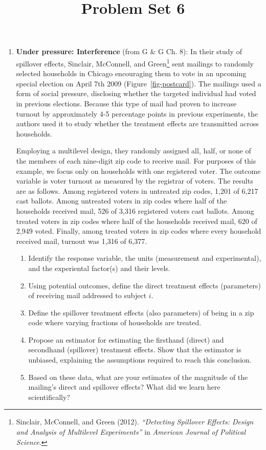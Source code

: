 \documentclass[
  letterpaper,
  DIV=11,
  numbers=noendperiod]{scrartcl}
\title{Problem Set 6}
\author{}
\date{}
\newcounter{none} %
\begin{document}
\maketitle


\begin{enumerate}
\def\labelenumi{\arabic{enumi}.}
\item
  \textbf{Under pressure: Interference} (from G \& G Ch. 8): In their
  study of spillover effects, Sinclair, McConnell, and Green\footnote{Sinclair,
    McConnell, and Green (2012). \emph{``Detecting Spillover Effects:
    Design and Analysis of Multilevel Experiments''} in \emph{American
    Journal of Political Science}.} sent mailings to randomly selected
  households in Chicago encouraging them to vote in an upcoming special
  election on April 7th 2009 (Figure~\ref{fig-postcard}). The mailings
  used a form of social pressure, disclosing whether the targeted
  individual had voted in previous elections. Because this type of mail
  had proven to increase turnout by approximately 4-5 percentage points
  in previous experiments, the authors used it to study whether the
  treatment effects are transmitted across households.

  Employing a multilevel design, they randomly assigned all, half, or
  none of the members of each nine-digit zip code to receive mail. For
  purposes of this example, we focus only on households with one
  registered voter. The outcome variable is voter turnout as measured by
  the registrar of voters. The results are as follows. Among registered
  voters in untreated zip codes, 1,201 of 6,217 cast ballots. Among
  untreated voters in zip codes where half of the households received
  mail, 526 of 3,316 registered voters cast ballots. Among treated
  voters in zip codes where half of the households received mail, 620 of
  2,949 voted. Finally, among treated voters in zip codes where every
  household received mail, turnout was 1,316 of 6,377.

  \begin{enumerate}
  \def\labelenumii{\alph{enumii}.}
  \item
    Identify the response variable, the units (measurement and
    experimental), and the experiental factor(s) and their levels.
  \item
    Using potential outcomes, define the direct treatment effects
    (parameters) of receiving mail addressed to subject \(i\).
  \item
    Define the spillover treatment effects (also parameters) of being in
    a zip code where varying fractions of households are treated.
  \item
    Propose an estimator for estimating the firsthand (direct) and
    secondhand (spillover) treatment effects. Show that the estimator is
    unbiased, explaining the assumptions required to reach this
    conclusion.
  \item
    Based on these data, what are your estimates of the magnitude of the
    mailing's direct and spillover effects? What did we learn here
    scientifically?
  \end{enumerate}


\end{enumerate}
\end{document}
